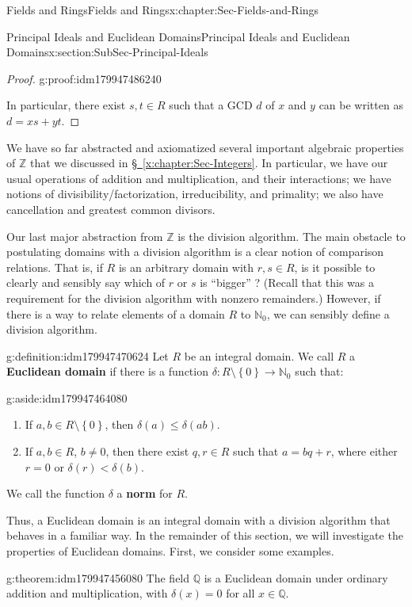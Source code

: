 \documentclass[oneside,10pt,]{book}
\newcommand{\xreffont}{\relax}
\newcommand{\terminology}[1]{\textbf{#1}}
\numberwithin{equation}{section}
\renewcommand{\le}{\leqslant}
\newcommand{\set}[1]{\left\{ {#1} \right\}}
\def\Z{{\mathbb Z}}
\def\Q{{\mathbb Q}}
\def\N{{\mathbb N}}
\newcommand{\lt}{<}
\begin{document}
\begin{chapterptx}{Fields and Rings}{}{Fields and Rings}{}{}{x:chapter:Sec-Fields-and-Rings}
\begin{sectionptx}{Principal Ideals and Euclidean Domains}{}{Principal Ideals and Euclidean Domains}{}{}{x:section:SubSec-Principal-Ideals}
\begin{proof}{}{g:proof:idm179947486240}
\par
In particular, there exist \(s,t\in R\) such that a GCD \(d\) of \(x\) and \(y\) can be written as \(d = xs + yt\).%
\end{proof}
We have so far abstracted and axiomatized several important algebraic properties of \(\Z\) that we discussed in \hyperref[x:chapter:Sec-Integers]{§~{\xreffont\ref{x:chapter:Sec-Integers}}}. In particular, we have our usual operations of addition and multiplication, and their interactions; we have notions of divisibility\slash{}factorization, irreducibility, and primality; we also have cancellation and greatest common divisors.%
\par
Our last major abstraction from \(\Z\) is the division algorithm. The main obstacle to postulating domains with a division algorithm is a clear notion of comparison relations. That is, if \(R\) is an arbitrary domain with \(r,s\in R\), is it possible to clearly and sensibly say which of \(r\) or \(s\) is ``bigger'' ? (Recall that this was a requirement for the division algorithm with nonzero remainders.) However, if there is a way to relate elements of a domain \(R\) to \(\N_0\), we can sensibly define a division algorithm.%
\begin{definition}{}{g:definition:idm179947470624}%
Let \(R\) be an integral domain. We call \(R\) a \terminology{Euclidean domain} if there is a function \(\delta : R\setminus \set{0} \to \N_0\) such that: \begin{aside}{}{g:aside:idm179947464080}%
\end{aside}
%
\begin{enumerate}
\item{}If \(a,b\in R\setminus \set{0}\), then \(\delta(a) \le \delta(ab)\).%
\item{}If \(a,b\in R\), \(b\ne 0\), then there exist \(q,r\in R\) such that \(a = bq+r\), where either \(r = 0\) or \(\delta(r) \lt \delta(b)\).%
\end{enumerate}
%
\par
We call the function \(\delta\) a \terminology{norm} for \(R\).%
\end{definition}
Thus, a Euclidean domain is an integral domain with a division algorithm that behaves in a familiar way. In the remainder of this section, we will investigate the properties of Euclidean domains. First, we consider some examples.%
\begin{theorem}{}{}{g:theorem:idm179947456080}%
The field \(\Q\) is a Euclidean domain under ordinary addition and multiplication, with \(\delta(x) = 0\) for all \(x\in \Q\).%

\end{theorem}
\end{sectionptx}
\end{chapterptx}
\end{document}
